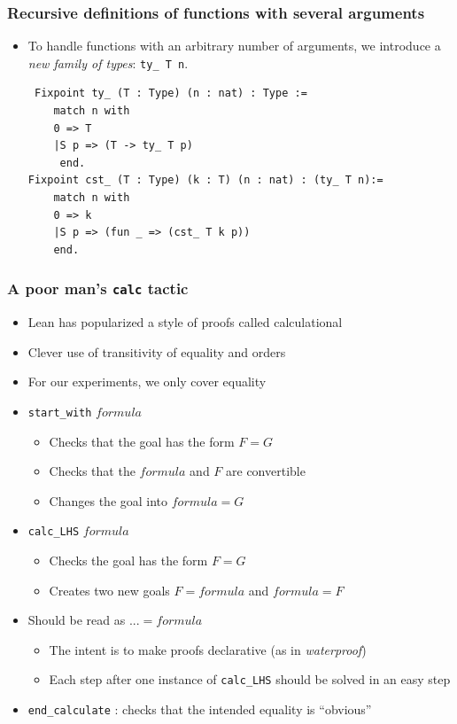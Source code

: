 \documentclass[compress]{beamer}
\begin{document}
\begin{frame}[fragile]
  \frametitle{Recursive definitions of functions with several arguments}
  \begin{itemize}

 \item To handle functions with an arbitrary number of arguments, we introduce a \emph{new family of types}: \texttt{ty\_ T n}.
 \begin{verbatim}
 Fixpoint ty_ (T : Type) (n : nat) : Type := 
    match n with
    0 => T
    |S p => (T -> ty_ T p)
     end.
Fixpoint cst_ (T : Type) (k : T) (n : nat) : (ty_ T n):= 
    match n with
    0 => k
    |S p => (fun _ => (cst_ T k p))
    end.
\end{verbatim}
 \end{itemize}
\end{frame}
\begin{frame}
\frametitle{A poor man's {\tt calc} tactic}
\begin{itemize}
\item Lean has popularized a style of proofs called calculational
\item Clever use of transitivity of equality and orders
\item For our experiments, we only cover equality
\item {\tt start\_with} \(formula\)
\begin{itemize}
\item Checks that the goal has the form \(F = G\)
\item Checks that the \(formula\) and \(F\) are convertible
\item Changes the goal into \(formula = G\)
\end{itemize}
\item {\tt calc\_LHS} \(formula\)
\begin{itemize}
\item Checks the goal has the form \(F = G\)
\item Creates two new goals \(F = formula\) and \(formula = F\)
\end{itemize}
\item Should be read as \(... = formula\)
\begin{itemize}
\item The intent is to make proofs declarative (as in {\em waterproof})
\item Each step after one instance of {\tt calc\_LHS} should be solved in an
  easy step
\end{itemize}
\item {\tt end\_calculate} : checks that the intended equality is ``obvious''
\end{itemize}
\end{frame}
\end{document}

